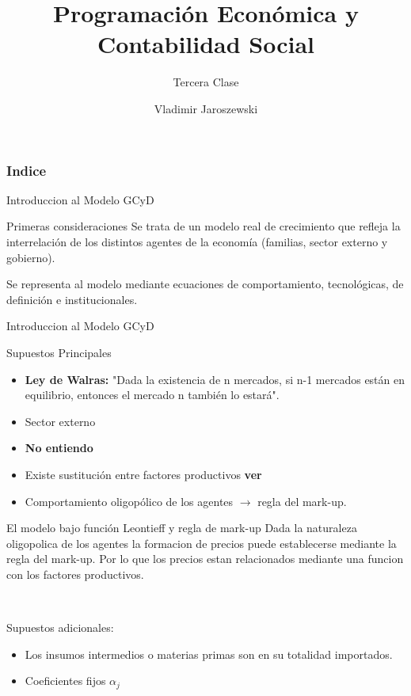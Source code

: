 \documentclass[
  ignorenonframetext,
]{beamer}
\title{Programación Económica y Contabilidad Social}
\subtitle{Tercera Clase}
\author{Vladimir Jaroszewski}
\date{}
\renewcommand*\contentsname{Table of contents}
\newcommand\contentsname{Table of contents}
\begin{document}
\frame{\titlepage}

\renewcommand*\contentsname{Indice}
\begin{frame}[allowframebreaks]
  \frametitle{Indice}
  \tableofcontents[hideallsubsections]
\end{frame}

\begin{frame}{Introduccion al Modelo GCyD}
\label{1}
\begin{block}{Primeras consideraciones}
\label{primeras-consideraciones}
Se trata de un modelo real de crecimiento que refleja la interrelación
de los distintos agentes de la economía (familias, sector externo y
gobierno).

Se representa al modelo mediante ecuaciones de comportamiento,
tecnológicas, de definición e institucionales.
\end{block}
\end{frame}

\begin{frame}{Introduccion al Modelo GCyD}
\label{introduccion-al-modelo-gcyd}
\begin{myblock}{Supuestos Principales}

\begin{itemize}
    \item \textbf{Ley de Walras:} "Dada la existencia de n mercados, si n-1 mercados están en equilibrio, entonces el mercado n también lo estará".
    \item Sector externo
    \item \textbf{No entiendo}
    \item Existe sustitución entre factores productivos \textbf{ver}
    \item Comportamiento oligopólico de los agentes $\longrightarrow$ regla del mark-up.
\end{itemize}

\end{myblock}
\end{frame}

\begin{frame}{El modelo bajo función Leontieff y regla de mark-up}
\label{2}
Dada la naturaleza oligopolica de los agentes la formacion de precios
puede establecerse mediante la regla del mark-up. Por lo que los precios
estan relacionados mediante una funcion con los factores productivos.

~

\begin{myblock}{Supuestos adicionales:}

  \begin{itemize}
    \item Los insumos intermedios o materias primas son en su totalidad importados.
    \item Coeficientes fijos $\alpha_j$
\end{itemize}
    
\end{myblock}
\end{frame}
\end{document}
